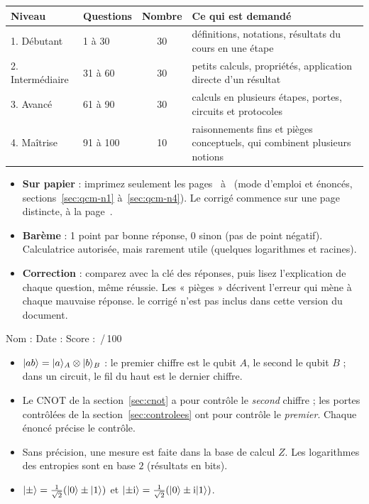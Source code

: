 \begin{center}
\renewcommand{\arraystretch}{1.3}
\begin{tabular}{@{}llc>{\raggedright\arraybackslash}p{8.2cm}@{}}
\toprule
\textbf{Niveau} & \textbf{Questions} & \textbf{Nombre} & \textbf{Ce qui est demandé}\\
\midrule
1. Débutant & 1 à 30 & 30 & définitions, notations, résultats du cours en une étape\\
2. Intermédiaire & 31 à 60 & 30 & petits calculs, propriétés, application directe d'un résultat\\
3. Avancé & 61 à 90 & 30 & calculs en plusieurs étapes, portes, circuits et protocoles\\
4. Maîtrise & 91 à 100 & 10 & raisonnements fins et pièges conceptuels, qui combinent plusieurs notions\\
\bottomrule
\end{tabular}
\end{center}

\begin{itemize}[nosep]
  \item \textbf{Sur papier} : imprimez seulement les pages~\pageref{chap:qcm} à~\pageref{qcm:fin}
        (mode d'emploi et énoncés, sections~\ref{sec:qcm-n1} à~\ref{sec:qcm-n4}).%
        \ifqcmcorrige{} Le corrigé commence sur une page distincte, à la page~\pageref{sec:qcm-cle}.\fi
  \item \textbf{Barème} : 1 point par bonne réponse, 0 sinon (pas de point négatif). Calculatrice
        autorisée, mais rarement utile (quelques logarithmes et racines).
  \item \textbf{Correction} :%
        \ifqcmcorrige{} comparez avec la clé des réponses, puis lisez l'explication de chaque
        question, même réussie. Les « pièges » décrivent l'erreur qui mène à chaque mauvaise réponse.%
        \else{} le corrigé n'est pas inclus dans cette version du document.\fi
\end{itemize}

\bigskip
\noindent Nom : \makebox[6cm]{\dotfill}\hfill Date : \makebox[3.5cm]{\dotfill}\hfill Score : \makebox[1.6cm]{\dotfill}\,/\,100
\bigskip

\begin{remarque}
\begin{itemize}[nosep]
  \item $|ab\rangle=|a\rangle_A\otimes|b\rangle_B$ : le premier chiffre est le qubit $A$, le second le
        qubit $B$ ; dans un circuit, le fil du haut est le dernier chiffre.
  \item Le CNOT de la section~\ref{sec:cnot} a pour contrôle le \emph{second} chiffre ; les portes
        contrôlées de la section~\ref{sec:controlees} ont pour contrôle le \emph{premier}. Chaque
        énoncé précise le contrôle.
  \item Sans précision, une mesure est faite dans la base de calcul $Z$. Les logarithmes des
        entropies sont en base $2$ (résultats en bits).
  \item $|\pm\rangle=\frac{1}{\sqrt2}(|0\rangle\pm|1\rangle)$ et $|{\pm}\mathrm{i}\rangle=\frac{1}{\sqrt2}(|0\rangle\pm\mathrm{i}|1\rangle)$.
\end{itemize}
\end{remarque}

